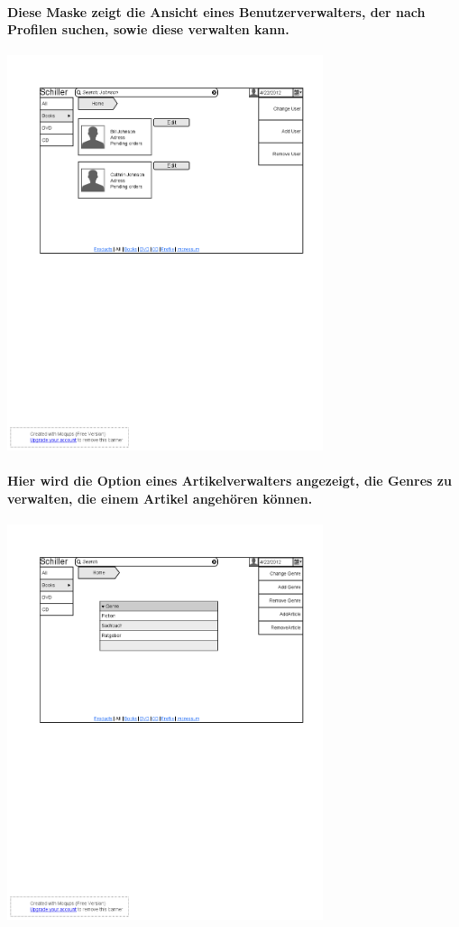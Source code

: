 \documentclass[a4paper]{article}
\begin{document}
\paragraph{Diese Maske zeigt die Ansicht eines Benutzerverwalters, der nach Profilen suchen, sowie diese verwalten kann.\\}
\includegraphics[width=350px]{15ChangeUser.png}

\paragraph{Hier wird die Option eines Artikelverwalters angezeigt, die Genres zu verwalten, die einem Artikel angehören können.\\}
\includegraphics[width=350px]{16ChangeGenre.png}
\end{document}
